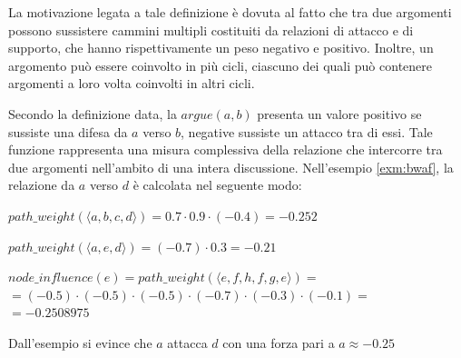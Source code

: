 La motivazione legata a tale definizione è dovuta al fatto che tra due argomenti possono sussistere
cammini multipli costituiti da relazioni di attacco e di supporto, che hanno rispettivamente un
peso negativo e positivo. Inoltre, un argomento può essere coinvolto in più cicli, ciascuno dei
quali può contenere argomenti a loro volta coinvolti in altri cicli. 

Secondo la definizione data, la $argue(a,b)$ presenta un valore positivo se sussiste una difesa da $a$ verso $b$, negative sussiste un attacco tra di essi. Tale funzione rappresenta una misura complessiva della relazione che intercorre tra due argomenti nell'ambito di una intera discussione. Nell'esempio \ref{exm:bwaf}, la relazione da $a$ verso $d$ è calcolata nel seguente modo:

\begin{center}

    $path\_weight(⟨a,b,c,d⟩) = 0.7 \cdot 0.9 \cdot (-0.4) = -0.252$
    
    $path\_weight(⟨a,e,d⟩) = (-0.7) \cdot 0.3 = -0.21$
    
    $node\_influence(e) = path\_weight(⟨e,f,h,f,g,e⟩) =$ \\ 
    $= (-0.5) \cdot (-0.5) \cdot(-0.5) \cdot (-0.7) \cdot (-0.3) \cdot (-0.1) =$ \\
    $= -0.2508975$
    
\end{center}

Dall'esempio si evince che $a$ attacca $d$ con una forza pari a $a \approx -0.25$


